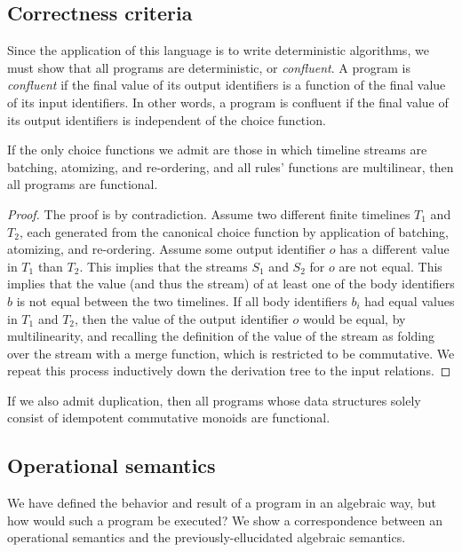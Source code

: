 \subsection{Correctness criteria}

Since the application of this language is to write deterministic algorithms, we must show that all programs are deterministic, or {\em confluent}.  A program is {\em confluent} if the final value of its output identifiers is a function of the final value of its input identifiers.  In other words, a program is confluent if the final value of its output identifiers is independent of the choice function.

\begin{theorem}[Confluence]
If the only choice functions we admit are those in which timeline streams are batching, atomizing, and re-ordering, and all rules' functions are multilinear, then all programs are functional.
\end{theorem}

\begin{proof}
The proof is by contradiction.  Assume two different finite timelines $T_1$ and $T_2$, each generated from the canonical choice function by application of batching, atomizing, and re-ordering.  Assume some output identifier $o$ has a different value in $T_1$ than $T_2$.  This implies that the streams $S_1$ and $S_2$ for $o$ are not equal.  This implies that the value (and thus the stream) of at least one of the body identifiers $b$ is not equal between the two timelines.  If all body identifiers $b_i$ had equal values in $T_1$ and $T_2$, then the value of the output identifier $o$ would be equal, by multilinearity, and recalling the definition of the value of the stream as folding over the stream with a merge function, which is restricted to be commutative.  We repeat this process inductively down the derivation tree to the input relations.
\end{proof}

\begin{corollary}
If we also admit duplication, then all programs whose data structures solely consist of idempotent commutative monoids are functional.
\end{corollary}


\subsection{Operational semantics}

We have defined the behavior and result of a program in an algebraic way, but how would such a program be executed?  We show a correspondence between an operational semantics and the previously-ellucidated algebraic semantics.

